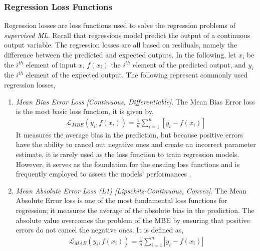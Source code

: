 \documentclass{article}
\begin{document}
  \subsubsection{Regression Loss Functions}%
  \label{sub:Loss Function}
    Regression losses are loss functions used to solve the regression problems of \textit{supervised ML}. Recall that regressions model predict the output of a continuous output variable. The regression losses are all based on residuals, namely the difference between the predicted and expected outputs. In the following, let $x_i$ be the $i^{th}$ element of input $x$, $f(x_i)$ the $i^{th}$ element of the predicted output, and $y_i$ the $i^{th}$ element of the expected output. The following represent commonly used regression losses,
  \begin{enumerate}
    \item \textit{Mean Bias Error Loss [Continuous, Differentiable]}. The Mean Bias Error loss is the most basic loss function, it is given by,
    \begin{equation}
      \begin{split}
        \mathcal{L}_{MBE} (y_i, f(x_i))= \frac{1}{n} \sum^{n}_{i=1} [y_i-f(x_i)]
      \end{split}
    \end{equation}
 It measures the average bias in the prediction, but because positive errors have the ability to cancel out negative ones and create an incorrect parameter estimate, it is rarely used as the loss function to train regression models. However, it serves as the foundation for the ensuing loss functions and is frequently employed to assess the models' performances \citep{ciampiconi2023survey}.
    \item \textit{Mean Absolute Error Loss (L1) [Lipschitz-Continuous, Convex].} The Mean Absolute Error loss is one of the most fundamental loss functions for regression; it measures the average of the absolute bias in the prediction. The absolute value overcomes the problem of the MBE by ensuring that positive errors do not cancel the negative ones. It is defined as, 
    \begin{equation}
      \begin{split}
        \mathcal{L}_{MAE}(y_i, f(x_i)) = \frac{1}{n} \sum^{n}_{i=1} |y_i-f(x_i)|
      \end{split}
    \end{equation}


\end{enumerate}
\end{document}
